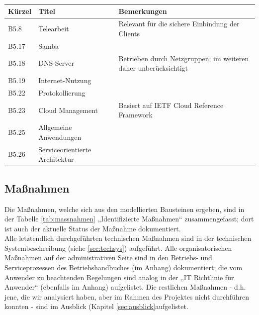 \begin{minipage}{\textwidth}
\begin{center}
\begin{tabular}{p{1cm}p{5cm}p{9cm}}
\toprule
Kürzel 	& Titel & Bemerkungen \\
\midrule
B5.8	& Telearbeit	& Relevant für die sichere Einbindung der Clients \\
B5.17	& Samba			& \\
B5.18	& DNS-Server	& Betrieben durch Netzgruppen; im weiteren daher unberücksichtigt \\
B5.19	& Internet-Nutzung	& \\
B5.22	& Protokollierung	& \\
B5.23	& Cloud Management	& Basiert auf IETF Cloud Reference Framework \\
B5.25	& Allgemeine Anwendungen	& \\
B5.26	& Serviceorientierte Architektur	& \\
\bottomrule
\end{tabular}
\end{center}
\end{minipage}

\subsection{Maßnahmen}
Die Maßnahmen, welche sich aus den modellierten Bausteinen ergeben, sind in der Tabelle \ref{tab:massnahmen} „Identifizierte Maßnahmen“ zusammengefasst; dort ist auch der aktuelle Status der Maßnahme dokumentiert.\\

Alle letztendlich durchgeführten technischen Maßnahmen sind in der technischen Systembeschreibung (siehe \ref{sec:techsys}) aufgeführt. Alle organisatorischen Maßnahmen auf der administrativen Seite sind in den Betriebs- und Serviceprozessen des Betriebshandbuches (im Anhang) dokumentiert;  die vom Anwender zu beachtenden Regelungen sind analog in der „IT Richtlinie für Anwender“ (ebenfalls im Anhang) aufgelistet. Die restlichen Maßnahmen - d.h. jene, die wir analysiert haben, aber im Rahmen des Projektes nicht durchführen konnten - sind im Ausblick (Kapitel \ref{sec:ausblick}aufgelistet.

